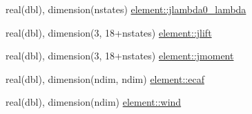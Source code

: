 \begin{DoxyCompactItemize}
\item 
real(dbl), dimension(nstates) \hyperlink{namespaceelement_abb09debf79a65110c87abb4892423e00}{element\+::jlambda0\+\_\+lambda}
\item 
real(dbl), dimension(3, 18+nstates) \hyperlink{namespaceelement_a2cc8d4739c02a1302e8c31d681c70eb8}{element\+::jlift}
\item 
real(dbl), dimension(3, 18+nstates) \hyperlink{namespaceelement_ac6e33874e30f493a8e29de4f0c87af0a}{element\+::jmoment}
\item 
real(dbl), dimension(ndim, ndim) \hyperlink{namespaceelement_a8cf9df9304438d7eaddcd8609c6968c5}{element\+::ecaf}
\item 
real(dbl), dimension(ndim) \hyperlink{namespaceelement_aeced564b191f69b1327f9b9164f371f5}{element\+::wind}
\end{DoxyCompactItemize}
